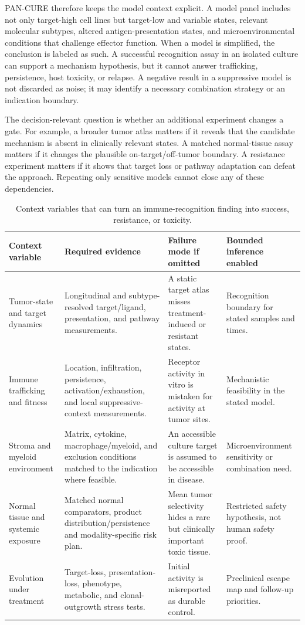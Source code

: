 \documentclass[10pt,conference]{IEEEtran}
\begin{document}
PAN-CURE therefore keeps the model context explicit. A model panel includes not only target-high cell lines but target-low and variable states, relevant molecular subtypes, altered antigen-presentation states, and microenvironmental conditions that challenge effector function. When a model is simplified, the conclusion is labeled as such. A successful recognition assay in an isolated culture can support a mechanism hypothesis, but it cannot answer trafficking, persistence, host toxicity, or relapse. A negative result in a suppressive model is not discarded as noise; it may identify a necessary combination strategy or an indication boundary.

The decision-relevant question is whether an additional experiment changes a gate. For example, a broader tumor atlas matters if it reveals that the candidate mechanism is absent in clinically relevant states. A matched normal-tissue assay matters if it changes the plausible on-target/off-tumor boundary. A resistance experiment matters if it shows that target loss or pathway adaptation can defeat the approach. Repeating only sensitive models cannot close any of these dependencies.

\begin{table}[!t]\caption{Context variables that can turn an immune-recognition finding into success, resistance, or toxicity.}\label{tab:context}\centering\footnotesize
\begin{tabular}{@{}p{}p{}p{}p{}@{}}\toprule
Context variable & Required evidence & Failure mode if omitted & Bounded inference enabled\\\midrule
Tumor-state and target dynamics & Longitudinal and subtype-resolved target/ligand, presentation, and pathway measurements. & A static target atlas misses treatment-induced or resistant states. & Recognition boundary for stated samples and times.\\
Immune trafficking and fitness & Location, infiltration, persistence, activation/exhaustion, and local suppressive-context measurements. & Receptor activity in vitro is mistaken for activity at tumor sites. & Mechanistic feasibility in the stated model.\\
Stroma and myeloid environment & Matrix, cytokine, macrophage/myeloid, and exclusion conditions matched to the indication where feasible. & An accessible culture target is assumed to be accessible in disease. & Microenvironment sensitivity or combination need.\\
Normal tissue and systemic exposure & Matched normal comparators, product distribution/persistence and modality-specific risk plan. & Mean tumor selectivity hides a rare but clinically important toxic tissue. & Restricted safety hypothesis, not human safety proof.\\
Evolution under treatment & Target-loss, presentation-loss, phenotype, metabolic, and clonal-outgrowth stress tests. & Initial activity is misreported as durable control. & Preclinical escape map and follow-up priorities.\\\bottomrule\end{tabular}\end{table}
\end{document}
